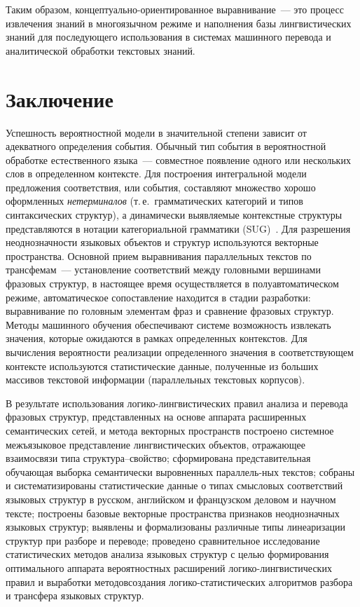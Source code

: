 \begin{multicols}{2}
  Таким образом, кон\-цеп\-ту\-аль\-но-ори\-ен\-ти\-ро\-ван\-ное 
выравнивание~--- это процесс извлечения знаний в многоязычном режиме и 
наполнения базы лингвистических знаний для последующего использо\-ва\-ния 
в системах машинного перевода и аналитической обработки текстовых 
знаний.
  
  \section{Заключение}
  
  Успешность вероятностной модели в значительной степени зависит от 
адекватного определения события. Обычный тип события в вероятностной 
обработке естественного языка~--- совместное появление одного или 
нескольких слов в определенном контексте. Для построения интегральной 
модели предложения соответствия, или события, составляют множество 
хорошо оформленных \textit{нетерминалов} (т.\,е.\ грамматических 
категорий и типов синтаксических структур), а динамически выявляемые 
контекстные структуры представляются в нотации категориальной 
грамматики (SUG)~\cite{2-koz, 3-koz}. Для разрешения неоднозначности 
языковых объектов и структур используются векторные пространства. 
Основной прием выравнивания параллельных текстов по трансфемам~--- 
установление соответствий между головными вершинами фразовых 
структур, в настоящее время осуществляется в полуавтоматическом режиме, 
автоматическое сопоставление находится в стадии разработки: выравнивание 
по головным элементам фраз и сравнение фразовых структур. Методы 
машинного обучения обеспечивают системе возможность извлекать 
значения, которые ожидаются в рамках определенных контекстов. Для 
вычисления вероятности реализации определенного значения в 
соответствующем контексте используются статистические данные, 
полученные из больших массивов текстовой информации (параллельных 
текстовых корпусов).
  
  В результате использования ло\-ги\-ко-линг\-ви\-стических правил 
анализа и перевода фразовых структур, представленных на основе аппарата 
расширенных семантических сетей, и метода векторных \mbox{пространств} 
построено системное межъязы\-ковое представление лингвистических 
объектов, отражающее взаимосвязи типа струк\-ту\-ра--свой\-ст\-во; 
сформирована представительная обучающая выборка семантически 
выровненных параллель-\linebreak ных текстов; собраны и систематизированы 
статистические данные о типах смысловых соответствий языковых структур 
в русском, английском и французском деловом и научном тексте; построены 
базовые векторные пространства признаков неоднозначных языковых 
структур; выявлены и формализованы различные типы линеаризации 
структур при разборе и переводе; проведено сравнительное исследование 
статистических методов анализа языковых структур с целью формирования 
оптимального аппарата вероятностных расширений 
  ло\-ги\-ко-линг\-ви\-сти\-че\-ских правил и выработки методов\linebreak создания 
логико-статистических алгоритмов разбора и трансфера языковых структур.
  

\end{multicols}
